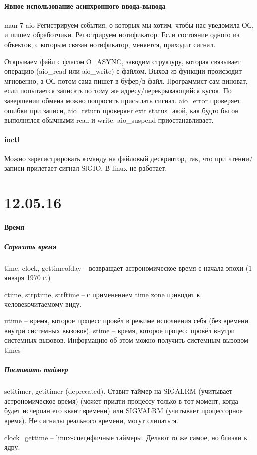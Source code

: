 \documentclass[a4paper,10pt]{article}
\begin{document}
\paragraph{Явное использование асинхронного ввода-вывода}
man 7 aio
Регистрируем события, о которых мы хотим, чтобы нас уведомила ОС, и пишем обработчики.
Регистрируем нотификатор. Если состояние одного из объектов, с которым связан нотификатор, меняется, приходит сигнал.

Открываем файл с флагом O\_ASYNC, заводим структуру, которая связывает операцию (aio\_read или aio\_write) с файлом. Выход из функции происзодит мгновенно, а ОС потом сама пишет в буфер/в файл. Программист сам виноват, если попытается записать по тому же адресу/перекрывающийся кусок.
По завершении обмена можно попросить присылать сигнал.
aio\_error проверяет ошибки при записи, aio\_return проверяет exit status такой, как будто бы он выполнялся обычными read и write. aio\_suspend приостанавливает.
\paragraph{ioctl}
Можно зарегистрировать команду на файловый дескриптор, так, что при чтении/записи прилетает сигнал SIGIO. В linux не работает.

\section{12.05.16}
\paragraph{Время}
\subparagraph{Спросить время}
time, clock, gettimeofday -- возвращает астрономическое время с начала эпохи (1 января 1970 г.)


ctime, strptime, strftime -- с применением time zone  приводит к человекочитаемому виду.

utime -- время, которое процесс провёл в режиме исполнения себя (без времени внутри системных вызовов), stime -- время, которое процесс провёл внутри системных вызовов.
Информацию об этом можно получить системным вызовом times
\subparagraph{Поставить таймер}
setitimer, getitimer (deprecated). Ставит таймер на SIGALRM (учитывает астрономическое время) (может придти процессу только в тот момент, когда будет исчерпан его квант времени) или SIGVALRM (учитывает процессорное время). Не сигналы реального времени, могут слипаться.

clock\_gettime -- linux-специфичные таймеры. Делают то же самое, но близки к ядру.
\end{document}
